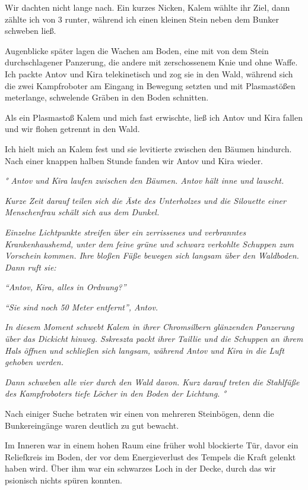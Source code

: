 \documentclass[11pt]{scrartcl}
\begin{document}
Wir dachten nicht lange nach. Ein kurzes Nicken, Kalem wählte ihr Ziel,
dann zählte ich von 3 runter, während ich einen kleinen Stein neben dem
Bunker schweben ließ.

Augenblicke später lagen die Wachen am Boden, eine mit von dem Stein
durchschlagener Panzerung, die andere mit zerschossenem Knie und ohne
Waffe. Ich packte Antov und Kira telekinetisch und zog sie in den Wald,
während sich die zwei Kampfroboter am Eingang in Bewegung setzten und
mit Plasmastößen meterlange, schwelende Gräben in den Boden schnitten.

Als ein Plasmastoß Kalem und mich fast erwischte, ließ ich Antov und
Kira fallen und wir flohen getrennt in den Wald.

Ich hielt mich an Kalem fest und sie levitierte zwischen den Bäumen
hindurch. Nach einer knappen halben Stunde fanden wir Antov und Kira
wieder.

\emph{° Antov und Kira laufen zwischen den Bäumen. Antov hält inne und
lauscht.}

\emph{Kurze Zeit darauf teilen sich die Äste des Unterholzes und die
Silouette einer Menschenfrau schält sich aus dem Dunkel.}

\emph{Einzelne Lichtpunkte streifen über ein zerrissenes und verbranntes
Krankenhaushemd, unter dem feine grüne und schwarz verkohlte Schuppen
zum Vorschein kommen. Ihre bloßen Füße bewegen sich langsam über den
Waldboden. Dann ruft sie:}

\emph{``Antov, Kira, alles in Ordnung?''}

\emph{``Sie sind noch 50 Meter entfernt'', Antov.}

\emph{In diesem Moment schwebt Kalem in ihrer Chromsilbern glänzenden
Panzerung über das Dickicht hinweg. Sskreszta packt ihrer Taillie und
die Schuppen an ihrem Hals öffnen und schließen sich langsam, während
Antov und Kira in die Luft gehoben werden.}

\emph{Dann schweben alle vier durch den Wald davon. Kurz darauf treten
die Stahlfüße des Kampfroboters tiefe Löcher in den Boden der Lichtung.
°}

Nach einiger Suche betraten wir einen von mehreren Steinbögen, denn die
Bunkereingänge waren deutlich zu gut bewacht.

Im Inneren war in einem hohen Raum eine früher wohl blockierte Tür,
davor ein Reliefkreis im Boden, der vor dem Energieverlust des Tempels
die Kraft gelenkt haben wird. Über ihm war ein schwarzes Loch in der
Decke, durch das wir psionisch nichts spüren konnten.
\end{document}
